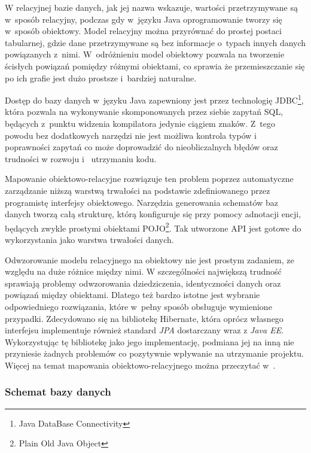 \documentclass[11pt]{aghdpl}
\begin{document}
W relacyjnej bazie danych, jak jej nazwa wskazuje, wartości przetrzymywane są w~sposób relacyjny, podczas gdy w~języku Java oprogramowanie tworzy się w~sposób obiektowy. Model relacyjny można przyrównać do prostej postaci tabularnej, gdzie dane przetrzymywane są bez informacje o~typach innych danych powiązanych z~nimi. W~odróżnieniu model obiektowy pozwala na tworzenie ścisłych powiązań pomiędzy różnymi obiektami, co sprawia że przemieszczanie się po ich grafie jest dużo prostsze i~bardziej naturalne.

Dostęp do bazy danych w~języku Java zapewniony jest przez technologię JDBC\footnote{Java DataBase Connectivity}, która pozwala na wykonywanie skomponowanych przez siebie zapytań SQL, będących z~punktu widzenia kompilatora jedynie ciągiem znaków. Z~tego powodu bez dodatkowych narzędzi nie jest możliwa kontrola typów i~ poprawności zapytań co może doprowadzić do nieobliczalnych błędów oraz trudności w rozwoju i~ utrzymaniu kodu.

Mapowanie obiektowo-relacyjne rozwiązuje ten problem poprzez automatyczne zarządzanie niższą warstwą trwałości na podstawie zdefiniowanego przez programistę interfejsy obiektowego. Narzędzia generowania schematów baz danych tworzą całą strukturę, którą konfiguruje się przy pomocy adnotacji encji, będących zwykle prostymi obiektami POJO\footnote{Plain Old Java Object}. Tak utworzone API jest gotowe do wykorzystania jako warstwa trwałości danych.

Odwzorowanie modelu relacyjnego na obiektowy nie jest prostym zadaniem, ze względu na duże różnice między nimi. W szczególności największą trudność sprawiają problemy odwzorowania dziedziczenia, identyczności danych oraz powiązań między obiektami. Dlatego też bardzo istotne jest wybranie odpowiedniego rozwiązania, które w~pełny sposób obsługuje wymienione przypadki. Zdecydowano się na bibliotekę Hibernate, która oprócz własnego interfejsu implementuje również standard \emph{JPA} dostarczany wraz z \emph{Java EE}. Wykorzystując tę bibliotekę jako jego implementację, podmiana jej na inną nie przyniesie żadnych problemów co pozytywnie wpływanie na utrzymanie projektu. Więcej na temat mapowania obiektowo-relacyjnego można przeczytać w~\cite{HORM}.

\subsubsection{Schemat bazy danych}
\end{document}
